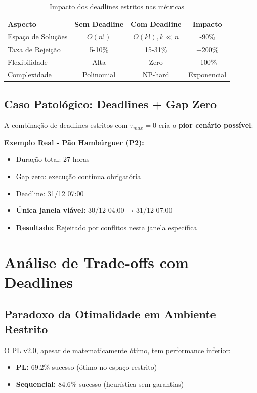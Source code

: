 \documentclass[11pt,a4paper]{article}
\begin{document}
\begin{table}[h]
\centering
\begin{tabular}{lccc}
\toprule
\textbf{Aspecto} & \textbf{Sem Deadline} & \textbf{Com Deadline} & \textbf{Impacto} \\
\midrule
Espaço de Soluções & $O(n!)$ & $O(k!), k \ll n$ & -90\% \\
Taxa de Rejeição & 5-10\% & 15-31\% & +200\% \\
Flexibilidade & Alta & Zero & -100\% \\
Complexidade & Polinomial & NP-hard & Exponencial \\
\bottomrule
\end{tabular}
\caption{Impacto dos deadlines estritos nas métricas}
\end{table}

\subsection{Caso Patológico: Deadlines + Gap Zero}

A combinação de deadlines estritos com $\tau_{max} = 0$ cria o \textbf{pior cenário possível}:

\textbf{Exemplo Real - Pão Hambúrguer (P2):}
\begin{itemize}
    \item Duração total: 27 horas
    \item Gap zero: execução contínua obrigatória
    \item Deadline: 31/12 07:00
    \item \textbf{Única janela viável:} 30/12 04:00 → 31/12 07:00
    \item \textbf{Resultado:} Rejeitado por conflitos nesta janela específica
\end{itemize}

\section{Análise de Trade-offs com Deadlines}

\subsection{Paradoxo da Otimalidade em Ambiente Restrito}

O PL v2.0, apesar de matematicamente ótimo, tem performance inferior:
\begin{itemize}
    \item \textbf{PL:} 69.2\% sucesso (ótimo no espaço restrito)
    \item \textbf{Sequencial:} 84.6\% sucesso (heurística sem garantias)
\end{itemize}
\end{document}
